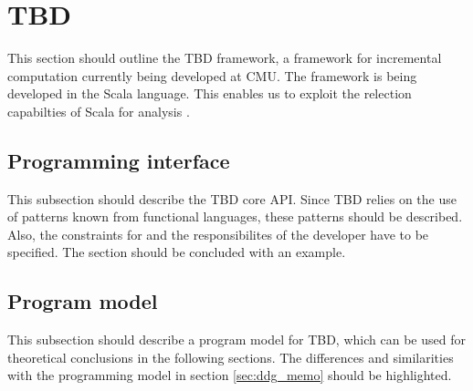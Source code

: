 \section{TBD}
This section should outline the TBD framework, a framework for incremental computation currently being developed at CMU. The framework is being developed in the Scala language. This enables us to exploit the relection capabilties of Scala for analysis \cite{burmako2013scala}. 

\subsection{Programming interface}
This subsection should describe the TBD core API. Since TBD relies on the use of patterns known from functional languages, these patterns should be described. Also, the constraints for and the responsibilites of the developer have to be specified. The section should be concluded with an example. 

\subsection{Program model}
This subsection should describe a program model for TBD, which can be used for theoretical conclusions in the following sections. The differences and similarities with the programming model in section \ref{sec:ddg_memo} should be highlighted.